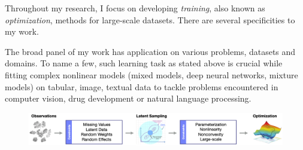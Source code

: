 \documentclass[twoside,11pt]{article}
\begin{document}
%
%
%
%
%
%
%


\textbf{}  \hfill \textbf{} 

 \hfill {}

\hfill

Throughout my research, I focus on developing \emph{training}, also known as \emph{optimization}, methods for large-scale datasets.
There are several specificities to my work.

The broad panel of my work has application on various problems, datasets and domains.
To name a few, such learning task as stated above is crucial while fitting complex nonlinear models (mixed models, deep neural networks, mixture models) on tabular, image, textual data to tackle problems encountered in computer vision, drug development or natural language processing.



\lipsum[35]

\begin{figure}[h]
\centering
\includegraphics[width=\textwidth]{fig2}
\end{figure}
     
\lipsum[35]
\lipsum[35]


\vspace{0.2in}
\end{document}
